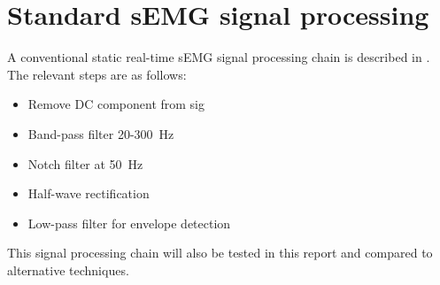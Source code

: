 \section{Standard sEMG signal processing}\label{section:standard_semg_processing}
A conventional static real-time sEMG signal processing chain is described in \cite{muscle_force_estimation}. The relevant steps are as follows:
\begin{itemize}
    \item Remove DC component from sig
    \item Band-pass filter 20-\SI{300}{\hertz}
    \item Notch filter at \SI{50}{\hertz}
    \item Half-wave rectification
    \item Low-pass filter for envelope detection
\end{itemize}

This signal processing chain will also be tested in this report and compared to alternative techniques.